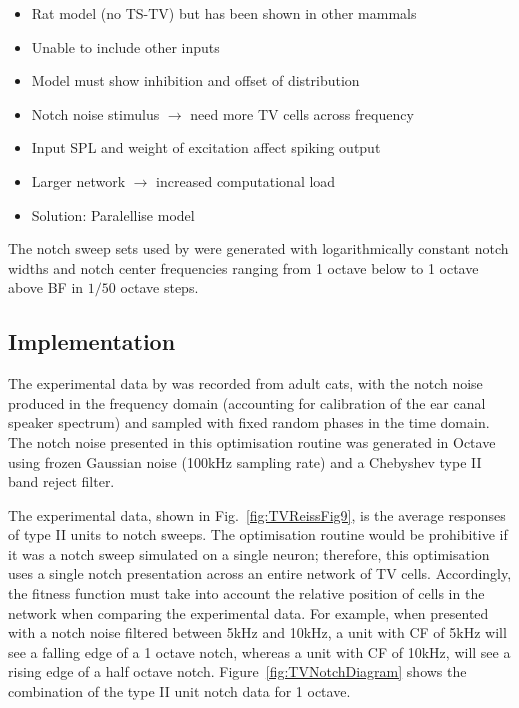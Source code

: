 \begin{itemize}
\item Rat model (no TS-TV) but has been shown in other mammals
\item Unable to include other \DCN inputs
\item Model must show \DSTV inhibition and offset of distribution

\item Notch noise stimulus $\rightarrow$ need more TV cells across
  frequency
\item Input SPL and weight of excitation affect spiking output
\item Larger network $\rightarrow$ increased computational load
\item Solution: Paralellise model
\end{itemize}

The notch sweep sets used by \citeauthor{ReissYoung:2005} were generated with
logarithmically constant notch widths and notch center frequencies ranging from 1 octave below to 1
octave above BF in $1/50$ octave steps. 

\subsection{Implementation}

The experimental data by \citet{ReissYoung:2005} was recorded from adult cats,
with the notch noise produced in the frequency domain (accounting for
calibration of the ear canal speaker spectrum) and sampled with fixed random
phases in the time domain. The notch noise presented in this optimisation
routine was generated in Octave using frozen Gaussian noise (100kHz sampling
rate) and a Chebyshev type II band reject filter.


The experimental data, shown in Fig.~\ref{fig:TVReissFig9}, is the average
responses of type II units to notch sweeps. The optimisation routine would be
prohibitive if it was a notch sweep simulated on a single neuron; therefore,
this optimisation uses a single notch presentation across an entire network of
TV cells. Accordingly, the fitness function must take into account the relative
position of cells in the network when comparing the experimental data.  For
example, when presented with a notch noise filtered between 5kHz and 10kHz, a
unit with CF of 5kHz will see a falling edge of a 1 octave notch, whereas a unit
with CF of 10kHz, will see a rising edge of a half octave notch.
Figure~\ref{fig:TVNotchDiagram} shows the combination of the type II unit notch
data for 1 octave.


